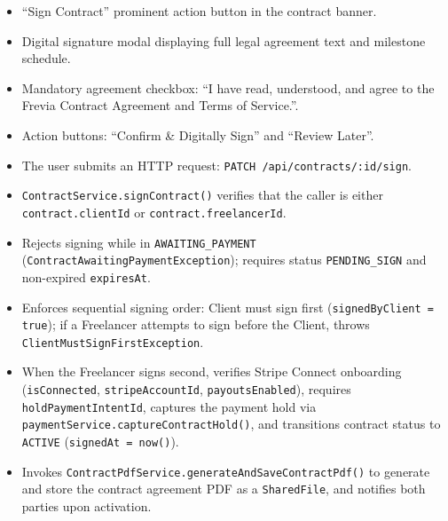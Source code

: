 \begin{itemize}[leftmargin=1.6em,topsep=3pt,itemsep=2pt,parsep=0pt,label=$\bullet$]
      \item ``Sign Contract'' prominent action button in the contract banner.
      \item Digital signature modal displaying full legal agreement text and milestone schedule.
      \item Mandatory agreement checkbox: ``I have read, understood, and agree to the Frevia Contract Agreement and Terms of Service.''.
      \item Action buttons: ``Confirm \& Digitally Sign'' and ``Review Later''.
\end{itemize}

\begin{itemize}[leftmargin=1.6em,topsep=3pt,itemsep=2pt,parsep=0pt,label=$\bullet$]
      \item The user submits an HTTP request: \texttt{PATCH /\allowbreak{}api/\allowbreak{}contracts/\allowbreak{}:\allowbreak{}id/\allowbreak{}sign}.
      \item \texttt{ContractService.signContract()} verifies that the caller is either \texttt{contract.clientId} or \texttt{contract.freelancerId}.
      \item Rejects signing while in \texttt{AWAITING\_PAYMENT} (\texttt{ContractAwaitingPaymentException}); requires status \texttt{PENDING\_SIGN} and non-expired \texttt{expiresAt}.
      \item Enforces sequential signing order: Client must sign first (\texttt{signedByClient = true}); if a Freelancer attempts to sign before the Client, throws \texttt{ClientMustSignFirstException}.
      \item When the Freelancer signs second, verifies Stripe Connect onboarding (\texttt{isConnected}, \texttt{stripeAccountId}, \texttt{payoutsEnabled}), requires \texttt{holdPaymentIntentId}, captures the payment hold via \texttt{paymentService.captureContractHold()}, and transitions contract status to \texttt{ACTIVE} (\texttt{signedAt = now()}).
      \item Invokes \texttt{ContractPdfService.generateAndSaveContractPdf()} to generate and store the contract agreement PDF as a \texttt{SharedFile}, and notifies both parties upon activation.
\end{itemize}


